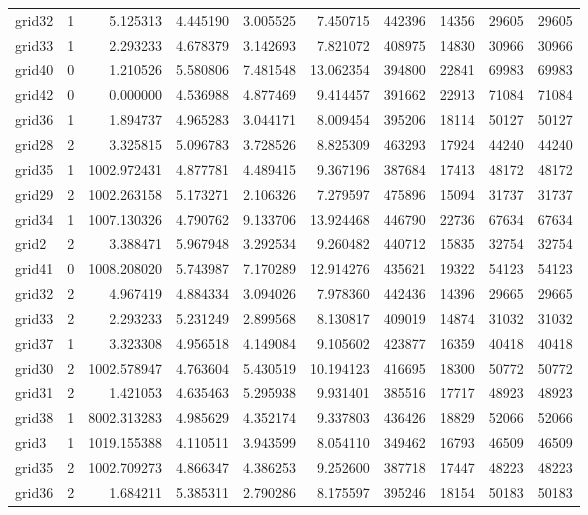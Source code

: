 \begin{longtable}{|l|r|r|r|r|r|r|r|r|r|}
grid32 & 1 & 5.125313 & 4.445190 & 3.005525 & 7.450715 & 442396 & 14356 & 29605 & 29605 \\
grid33 & 1 & 2.293233 & 4.678379 & 3.142693 & 7.821072 & 408975 & 14830 & 30966 & 30966 \\
grid40 & 0 & 1.210526 & 5.580806 & 7.481548 & 13.062354 & 394800 & 22841 & 69983 & 69983 \\
grid42 & 0 & 0.000000 & 4.536988 & 4.877469 & 9.414457 & 391662 & 22913 & 71084 & 71084 \\
grid36 & 1 & 1.894737 & 4.965283 & 3.044171 & 8.009454 & 395206 & 18114 & 50127 & 50127 \\
grid28 & 2 & 3.325815 & 5.096783 & 3.728526 & 8.825309 & 463293 & 17924 & 44240 & 44240 \\
grid35 & 1 & 1002.972431 & 4.877781 & 4.489415 & 9.367196 & 387684 & 17413 & 48172 & 48172 \\
grid29 & 2 & 1002.263158 & 5.173271 & 2.106326 & 7.279597 & 475896 & 15094 & 31737 & 31737 \\
grid34 & 1 & 1007.130326 & 4.790762 & 9.133706 & 13.924468 & 446790 & 22736 & 67634 & 67634 \\
grid2 & 2 & 3.388471 & 5.967948 & 3.292534 & 9.260482 & 440712 & 15835 & 32754 & 32754 \\
grid41 & 0 & 1008.208020 & 5.743987 & 7.170289 & 12.914276 & 435621 & 19322 & 54123 & 54123 \\
grid32 & 2 & 4.967419 & 4.884334 & 3.094026 & 7.978360 & 442436 & 14396 & 29665 & 29665 \\
grid33 & 2 & 2.293233 & 5.231249 & 2.899568 & 8.130817 & 409019 & 14874 & 31032 & 31032 \\
grid37 & 1 & 3.323308 & 4.956518 & 4.149084 & 9.105602 & 423877 & 16359 & 40418 & 40418 \\
grid30 & 2 & 1002.578947 & 4.763604 & 5.430519 & 10.194123 & 416695 & 18300 & 50772 & 50772 \\
grid31 & 2 & 1.421053 & 4.635463 & 5.295938 & 9.931401 & 385516 & 17717 & 48923 & 48923 \\
grid38 & 1 & 8002.313283 & 4.985629 & 4.352174 & 9.337803 & 436426 & 18829 & 52066 & 52066 \\
grid3 & 1 & 1019.155388 & 4.110511 & 3.943599 & 8.054110 & 349462 & 16793 & 46509 & 46509 \\
grid35 & 2 & 1002.709273 & 4.866347 & 4.386253 & 9.252600 & 387718 & 17447 & 48223 & 48223 \\
grid36 & 2 & 1.684211 & 5.385311 & 2.790286 & 8.175597 & 395246 & 18154 & 50183 & 50183 \\

\end{longtable}
